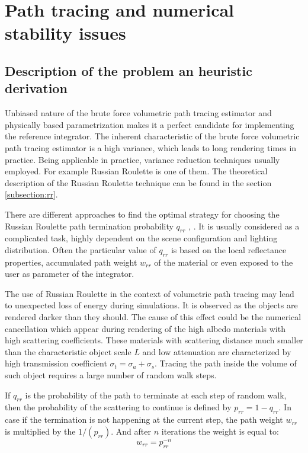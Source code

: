 \section{Path tracing and numerical stability issues}
\label{section:numerical}

\subsection{Description of the problem an heuristic derivation}
Unbiased nature of the brute force volumetric path tracing estimator and physically based
parametrization makes it a perfect candidate for implementing the reference integrator.
The inherent characteristic of the brute force volumetric path tracing estimator is a high variance,
which leads to long rendering times in practice. Being applicable in practice, variance reduction
techniques usually employed. For example Russian Roulette is one of them. The theoretical
description of the Russian Roulette technique can be found in the section \ref{subsection:rr}.

There are different approaches to find the optimal strategy for choosing the Russian Roulette path
termination probability $q_{rr}$ \cite{Veach:1998:RMC:927297}, \cite{And_findinggood}. It is usually
considered as a complicated task, highly dependent on the scene configuration and lighting
distribution. Often the particular value of $q_{rr}$ is based on the local reflectance properties,
accumulated path weight $w_{rr}$ of the material or even exposed to the user as parameter of the
integrator.

The use of Russian Roulette in the context of volumetric path tracing may lead to unexpected loss of
energy during simulations. It is observed as the objects are rendered darker than they should. The
cause of this effect could be the numerical cancellation which appear during rendering of the high
albedo materials with high scattering coefficients. These materials with scattering distance much
smaller than the characteristic object scale $L$ and low attenuation are characterized by high
transmission coefficient $\sigma_t = \sigma_a + \sigma_s$. Tracing the path inside the volume of
such object requires a large number of random walk steps. 

If $q_{rr}$ is the probability of the path to terminate at each step of random walk, then the
probability of the scattering to continue is defined by $p_{rr} = 1 - q_{rr}$. In case if the
termination is not happening at the current step, the path weight $w_{rr}$ is multiplied by the
$1/(p_{rr})$. And after $n$ iterations the weight is equal to:
\begin{equation}
w_{rr} = p_{rr}^{-n}
\end{equation}

